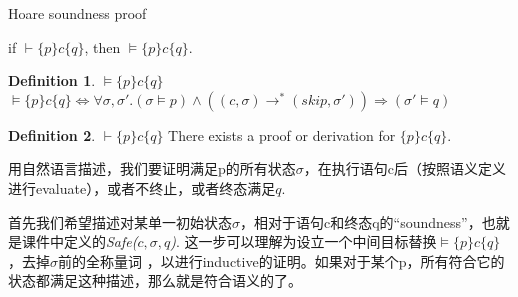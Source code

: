 \documentclass{ctexart}
\theoremstyle{definition}
\newtheorem{definition}{Definition}[section]
\newenvironment{claim}[2][Claim]{\begin{trivlist}
\item[\hskip \labelsep {\bfseries #1}\hskip \labelsep {\bfseries #2.}]}{\end{trivlist}}
\begin{document}
\large %
\linespread{1.5} %



\begin{center}
{\Large Hoare soundness proof}
\end{center}
\vspace{0.05in}

%


\begin{claim}{Soundness for partial correctness}
if $\vdash\{p\}c\{q\}$, then $\models\{p\}c\{q\}$.  
\end{claim}

\begin{definition}{$\models\{p\}c\{q\}$}
\newline
$\models\{p\}c\{q\} \iff \forall \sigma,\sigma'.(\sigma\models p)\wedge((c,\sigma)\longrightarrow^*(skip, \sigma'))\Rightarrow(\sigma'\models q)$
\end{definition}

\begin{definition}{$\vdash\{p\}c\{q\}$}
    \newline
    There exists a proof or derivation for $\{p\}c\{q\}$.
\end{definition}

用自然语言描述，我们要证明满足p的所有状态$\sigma$，在执行语句c后（按照语义定义进行evaluate），或者不终止，或者终态满足$q$.

首先我们希望描述对某单一初始状态$\sigma$，相对于语句c和终态q的“soundness”，也就是课件中定义的\textit{Safe($c,\sigma,q$)}. 这一步可以理解为设立一个中间目标替换$\models\{p\}c\{q\}$，去掉$\sigma$前的全称量词
，以进行inductive的证明。如果对于某个p，所有符合它的状态都满足这种描述，那么就是符合语义的了。
\end{document}
